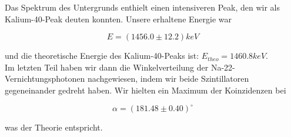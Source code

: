 Das Spektrum des Untergrunds enthielt einen intensiveren Peak, den wir als Kalium-40-Peak deuten konnten. Unsere erhaltene Energie war 

$$E = (1456.0 \pm 12.2) keV $$

und die theoretische Energie des Kalium-40-Peaks ist: $E_{theo} = 1460.8 keV$.\\

Im letzten Teil haben wir dann die Winkelverteilung der Na-22-Vernichtungsphotonen nachgewiesen, indem wir beide Szintillatoren gegeneinander gedreht haben. Wir hielten ein Maximum der Koinzidenzen bei

$$\alpha = (181.48 \pm 0.40)^\circ$$

was der Theorie entspricht.